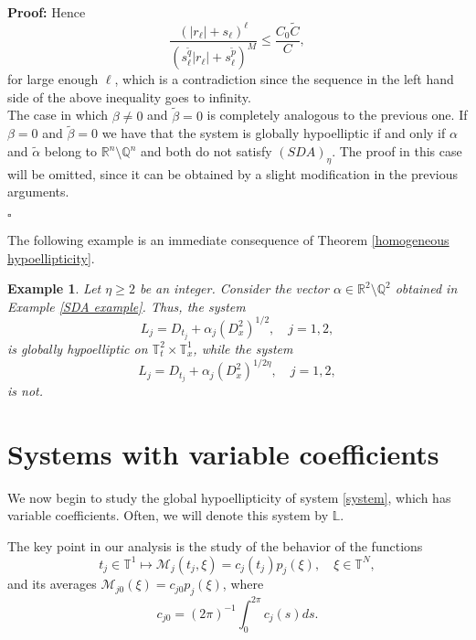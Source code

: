 \documentclass[12pt]{elsarticle}
\newtheorem{example}[theorem]{Example}
\numberwithin{equation}{section}
\newenvironment{proof}[1][\noindent \textbf{Proof: }]{#1}{ \hfill $\square$ \vspace{2mm}}
\begin{document}
\begin{proof}
	Hence
	$$
	\dfrac{(|r_\ell|+s_\ell)^{\ell}}{(s_{\ell}^{\widetilde{q}}|r_\ell|+s_{\ell}^{\widetilde{p}})^M}
	\leq
	\frac{C_0\widetilde{C}}{C},
	$$
	for large enough $\ell$, which is a contradiction since the sequence in the left hand side of the above inequality goes to infinity.\\
	
	
	The case in which ${\beta}\neq 0$ and   $\widetilde{\beta}=0$ is completely analogous to the previous one. If ${\beta}= 0$ and   $\widetilde{\beta}=0$ we have that the system is globally hypoelliptic if and only if $\alpha$ and $\widetilde{\alpha}$ belong to $\mathbb{R}^n\setminus\mathbb{Q}^n$ and both do not satisfy $(SDA)_\eta$. The proof in this case will be omitted, since it can be obtained by a slight modification in the previous arguments.
	
\end{proof}

The following example is an immediate consequence of Theorem \ref{homogeneous hypoellipticity}.

\begin{example} Let $\eta\geq 2$ be an integer. 
	Consider the vector $\alpha\in\mathbb{R}^2\setminus\mathbb{Q}^2$ obtained in Example \ref{SDA example}. Thus, the system 
	$$
	L_j=D_{t_j}+\alpha_{j}(D_x^{2})^{1/2},\quad j=1,2,
	$$
	is globally hypoelliptic on $\mathbb{T}_t^2\times\mathbb{T}_x^1$, while the system
	$$
	L_j=D_{t_j}+\alpha_{j}(D_x^{2})^{1/2\eta},\quad j=1,2,
	$$
	is not.
\end{example} 	




\section{Systems with variable coefficients}\label{Systems with variable coefficients}
We now begin to study the global hypoellipticity of system  \eqref{system}, which has variable coefficients. Often, we will denote this system by $\mathbb{L}$.



The key point in our analysis is the study  of the behavior of the functions
\begin{equation}\label{functions-M-j}
t_{j} \in \mathbb{T}^1 \mapsto \mathcal{M}_j(t_j, \xi) = c_j(t_j)p_j(\xi),\quad \xi \in \mathbb{T}^N,
\end{equation}
and its averages
$\mathcal{M}_{j0}(\xi) = c_{j0}p_j(\xi)$, where 
$$
c_{j0} = (2\pi)^{-1} \int_{0}^{2\pi}c_j(s) ds.
$$
\end{document}

